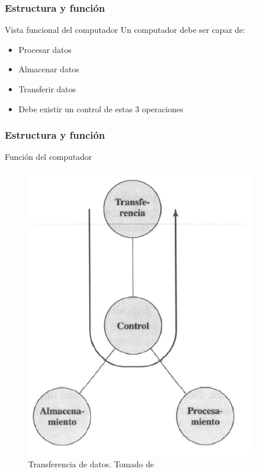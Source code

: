 \documentclass{beamer}
\begin{document}
	\begin{frame}
 		\frametitle{Estructura y función}
		\begin{block}{Vista funcional del computador}
		Un computador debe ser capaz de:
		\begin{itemize}
			\item Procesar datos
			\item Almacenar datos
			\item Transferir datos
			\item Debe existir un control de estas 3 operaciones
		\end{itemize}
		\end{block}
	\end{frame}
	
	\begin{frame}
 		\frametitle{Estructura y función}
		\begin{block}{Función del computador}
\begin{figure}[H]
\centering
\includegraphics[scale=0.4]{imagenes/pc4.png}
\caption{Transferencia de datos. Tomado de \cite{stallings}}
\end{figure}
		\end{block}
	\end{frame}
	
\end{document}
